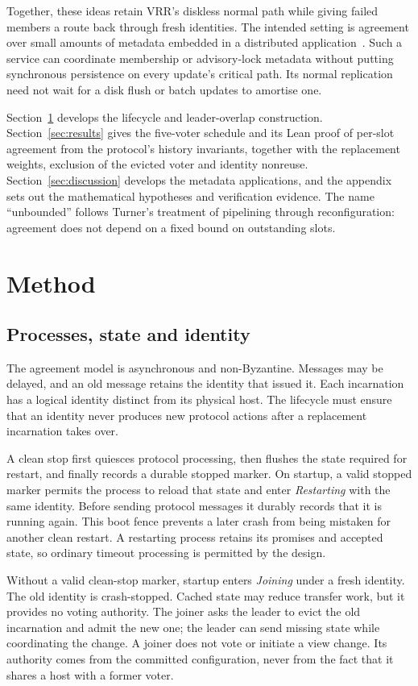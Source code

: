\documentclass[10pt,journal,letterpaper]{IEEEtran}
\begin{document}
Together, these ideas retain VRR's diskless normal path while giving failed
members a route back through fresh identities.
The intended setting is agreement over small amounts of metadata embedded in a
distributed application~\cite{motivation}.
Such a service can coordinate membership or advisory-lock metadata without
putting synchronous persistence on every update's critical path.
Its normal replication need not wait for a disk flush or batch updates to
amortise one.

Section~\ref{sec:method} develops the lifecycle and leader-overlap construction.
Section~\ref{sec:results} gives the five-voter schedule and its Lean proof of
per-slot agreement from the protocol's history invariants, together with the
replacement weights, exclusion of the evicted voter and identity nonreuse.
Section~\ref{sec:discussion} develops the metadata applications, and the appendix
sets out the mathematical hypotheses and verification evidence.
The name ``unbounded'' follows Turner's treatment of pipelining through
reconfiguration: agreement does not depend on a fixed bound on outstanding slots.

\section{Method}\label{sec:method}
\subsection{Processes, state and identity}
The agreement model is asynchronous and non-Byzantine. Messages may be delayed, and an old message retains the identity that issued it. Each incarnation has a logical identity distinct from its physical host. The lifecycle must ensure that an identity never produces new protocol actions after a replacement incarnation takes over.

A clean stop first quiesces protocol processing, then flushes the state required for restart, and finally records a durable stopped marker. On startup, a valid stopped marker permits the process to reload that state and enter \emph{Restarting} with the same identity. Before sending protocol messages it durably records that it is running again. This boot fence prevents a later crash from being mistaken for another clean restart. A restarting process retains its promises and accepted state, so ordinary timeout processing is permitted by the design.

Without a valid clean-stop marker, startup enters \emph{Joining} under a fresh identity. The old identity is crash-stopped. Cached state may reduce transfer work, but it provides no voting authority. The joiner asks the leader to evict the old incarnation and admit the new one; the leader can send missing state while coordinating the change. A joiner does not vote or initiate a view change. Its authority comes from the committed configuration, never from the fact that it shares a host with a former voter.
\end{document}
